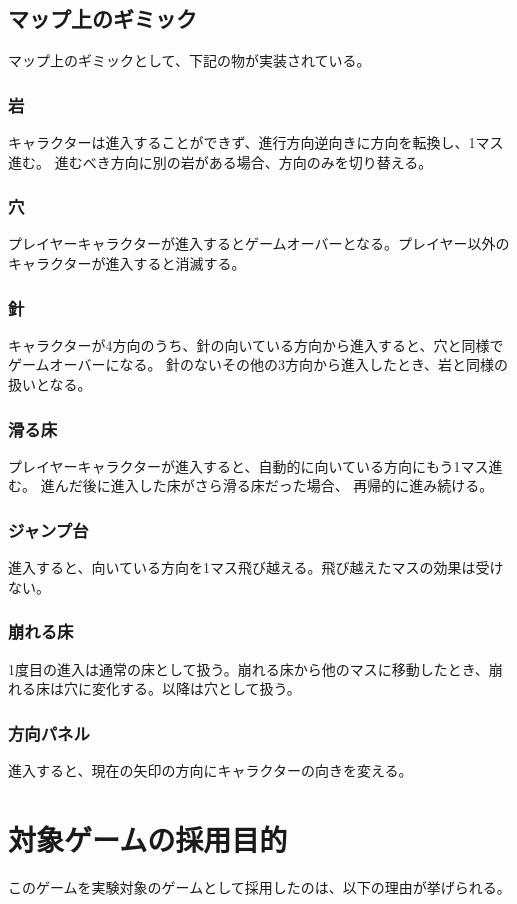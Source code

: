 \subsection{マップ上のギミック}
マップ上のギミックとして、下記の物が実装されている。

\subsubsection{岩}
キャラクターは進入することができず、進行方向逆向きに方向を転換し、1マス進む。
進むべき方向に別の岩がある場合、方向のみを切り替える。
\subsubsection{穴}
プレイヤーキャラクターが進入するとゲームオーバーとなる。プレイヤー以外のキャラクターが進入すると消滅する。
\subsubsection{針}
キャラクターが4方向のうち、針の向いている方向から進入すると、穴と同様でゲームオーバーになる。
針のないその他の3方向から進入したとき、岩と同様の扱いとなる。
\subsubsection{滑る床}
プレイヤーキャラクターが進入すると、自動的に向いている方向にもう1マス進む。
進んだ後に進入した床がさら滑る床だった場合、
再帰的に進み続ける。
\subsubsection{ジャンプ台}
進入すると、向いている方向を1マス飛び越える。飛び越えたマスの効果は受けない。
\subsubsection{崩れる床}
1度目の進入は通常の床として扱う。崩れる床から他のマスに移動したとき、崩れる床は穴に変化する。以降は穴として扱う。
\subsubsection{方向パネル}
進入すると、現在の矢印の方向にキャラクターの向きを変える。

\section{対象ゲームの採用目的}
このゲームを実験対象のゲームとして採用したのは、以下の理由が挙げられる。
